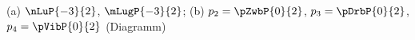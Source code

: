 (a) $\nLuP{-3}{2}$, $\mLugP{-3}{2}$; (b) $p_2 = \pZwbP{0}{2}$, $p_3 = \pDrbP{0}{2}$, $p_4 = \pVibP{0}{2}$ (Diagramm)
